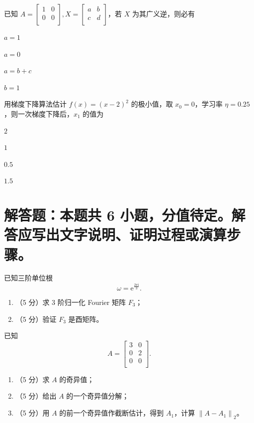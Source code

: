 \documentclass[11pt,a4paper]{exam-zh}
\begin{document}
\begin{question}
  已知 $A = \begin{bmatrix}
    1 & 0 \\
    0 & 0 \\
  \end{bmatrix}, X = \begin{bmatrix}
    a & b \\
    c & d \\
  \end{bmatrix}$，若 $X$ 为其广义逆，则必有
  \begin{choices}
    \item $a = 1$
    \item $a = 0$
    \item $a = b + c$
    \item $b = 1$
  \end{choices}
\end{question}

\begin{question}
  用梯度下降算法估计 $f \left(x\right) = \left(x - 2\right)^2$ 的极小值，取 $x_0 = 0$，学习率 $\eta = 0.25$，则一次梯度下降后，$x_1$ 的值为
  \begin{choices}
    \item $2$
    \item $1$
    \item $0.5$
    \item $1.5$
  \end{choices}
\end{question}

\section{解答题：本题共 6 小题，分值待定。解答应写出文字说明、证明过程或演算步骤。}

\begin{problem}
  已知三阶单位根 $$\omega = \mathrm{e}^{\frac{2\pi\mathrm{i}}{3}}.$$
  \begin{enumerate}
    \item （5 分）求 3 阶归一化 Fourier 矩阵 $F_3$；
    \item （5 分）验证 $F_3$ 是酉矩阵。
  \end{enumerate}
\end{problem}

\begin{problem}
  已知 $$A = \begin{bmatrix}
    3 & 0 \\
    0 & 2 \\
    0 & 0 \\
  \end{bmatrix}.$$
  \begin{enumerate}
    \item （5 分）求 $A$ 的奇异值；
    \item （5 分）给出 $A$ 的一个奇异值分解；
    \item （5 分）用 $A$ 的前一个奇异值作截断估计，得到 $A_1$，计算 $\left\|A - A_1\right\|_2$。
  \end{enumerate}
\end{problem}
\end{document}
